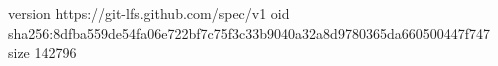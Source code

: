 version https://git-lfs.github.com/spec/v1
oid sha256:8dfba559de54fa06e722bf7c75f3c33b9040a32a8d9780365da660500447f747
size 142796
